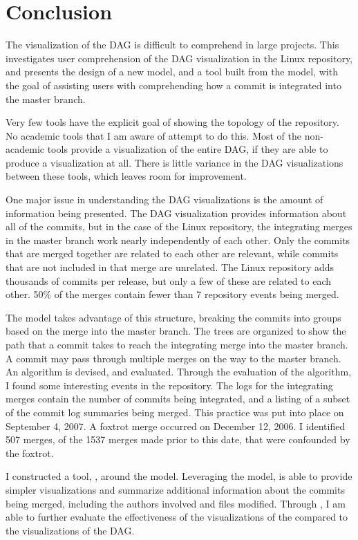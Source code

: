 \chapter{Conclusion}\label{chap:conclusion}

The visualization of the DAG is difficult to comprehend in large
projects. This \paper{} investigates user comprehension of the DAG
visualization in the Linux repository, and presents the design of a new
model, and a tool built from the model, with the goal of assisting users
with comprehending how a commit is integrated into the master branch.

Very few tools have the explicit goal of showing the topology of the
repository. No academic tools that I am aware of attempt to do this.
Most of the non-academic tools provide a visualization of the entire
DAG, if they are able to produce a visualization at all. There is little
variance in the DAG visualizations between these tools, which leaves
room for improvement.

One major issue in understanding the DAG visualizations is the amount of
information being presented. The DAG visualization provides information
about all of the commits, but in the case of the Linux repository, the
integrating merges in the master branch work nearly independently of
each other. Only the commits that are merged together are related to
each other are relevant, while commits that are not included in that
merge are unrelated. The Linux repository adds thousands of commits per
release, but only a few of these are related to each other. 50\% of the
merges contain fewer than 7 repository events being merged.

The \mt{} model takes advantage of this structure, breaking the commits
into groups based on the merge into the master branch. The trees are
organized to show the path that a commit takes to reach the integrating
merge into the master branch. A commit may pass through multiple merges
on the way to the master branch. An algorithm is devised, and evaluated.
Through the evaluation of the algorithm, I found some interesting events
in the repository. The logs for the integrating merges contain the
number of commits being integrated, and a listing of a subset of the
commit log summaries being merged. This practice was put into place on
September 4, 2007. A foxtrot merge occurred on December 12, 2006. I
identified 507 merges, of the 1537 merges made prior to this date, that
were confounded by the foxtrot.

I constructed a tool, \tool{}, around the \mt{} model. Leveraging the
model, \tool{} is able to provide simpler visualizations and summarize
additional information about the commits being merged, including the
authors involved and files modified. Through \tool{}, I am able to
further evaluate the effectiveness of the visualizations of the \mt{}
compared to the visualizations of the DAG\@.

